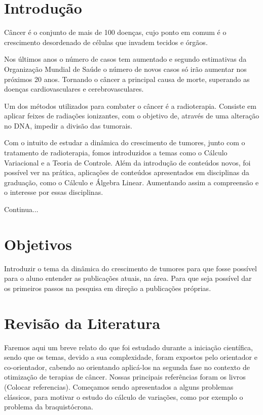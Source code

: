 \documentclass[12pt, a4paper]{article}
\makeatletter
\renewcommand\tableofcontents{
  \null\hfill\textbf{\Large\contentsname}\hfill\null\par
  \@mkboth{\MakeUppercase\contentsname}{\MakeUppercase\contentsname}
  \@starttoc{toc}
}
\makeatother
\begin{document}
 
 \begin{flushleft}
 
\tableofcontents 


\end{flushleft}
\newpage

\section{ Introdução}

Câncer é o conjunto de mais de 100 doenças, cujo ponto em comum é o crescimento desordenado de células que invadem tecidos e órgãos.\

Nos últimos anos o número de casos tem aumentado e segundo estimativas da Organização Mundial de Saúde o número de novos casos só irão aumentar nos próximos 20 anos. Tornando o câncer a principal causa de morte, superando as doenças cardiovasculares e cerebrovasculares. \

Um dos métodos utilizados para combater o câncer é a radioterapia. Consiste em aplicar feixes de radiações ionizantes, com o objetivo de, através de uma alteração no DNA, impedir a divisão das  tumorais.\

Com o intuito de estudar a dinâmica do crescimento de tumores, junto com o tratamento de radioterapia, fomos introduzidos a temas como o Cálculo Variacional e a Teoria de Controle. Além da introdução de conteúdos novos, foi possível ver na prática, aplicações de conteúdos apresentados em disciplinas da graduação, como o Cálculo e Álgebra Linear. Aumentando assim a compreensão e o interesse por essas disciplinas.\

Continua...

\newpage

\section{Objetivos}
Introduzir o tema da dinâmica do crescimento de tumores para que fosse possível para o aluno entender as publicações atuais, na área. Para que seja possível dar os primeiros passos na pesquisa em direção a publicações próprias.

\newpage

\section{Revisão da Literatura}

Faremos aqui um breve relato do que foi estudado durante a iniciação científica, sendo que os temas, devido a sua complexidade, foram expostos pelo orientador e  co-orientador, cabendo ao orientando aplicá-los na segunda fase no contexto de otimização de terapias de câncer. Nossas principais referências foram os livros (Colocar referencias).
Começamos sendo apresentados a alguns problemas clássicos, para motivar o estudo do cálculo de variações, como por exemplo o problema da braquistócrona.
\end{document}
